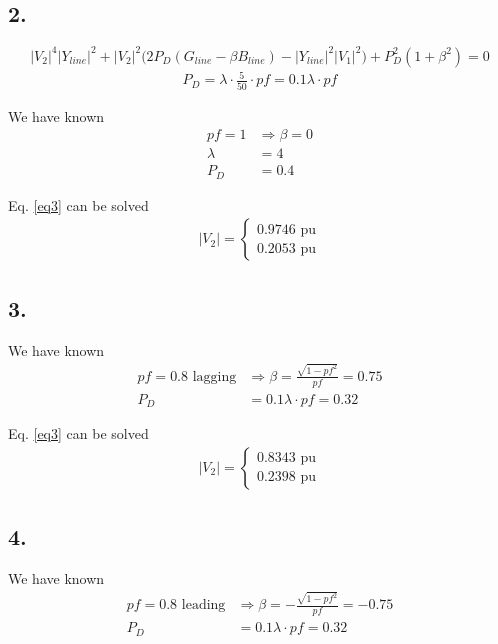 \documentclass{article}
\begin{document}
\subsection*{2.}
\begin{equation}\label{eq3}
|V_2|^4 |Y_{line}|^2 + |V_2|^2 \Big(2 P_D (G_{line} - \beta B_{line}) - |Y_{line}|^2 |V_1|^2 \Big) + P_D^2 (1+\beta^2) = 0
\end{equation}
\begin{align*}
P_D = \lambda \cdot \frac{5}{50} \cdot pf = 0.1 \lambda \cdot pf
\end{align*}

We have known
\begin{align*}
pf = 1 &\Longrightarrow \beta = 0\\
\lambda &= 4\\
P_D &= 0.4
\end{align*}

Eq. \ref{eq3} can be solved
\begin{align*}
|V_2| =
\begin{cases}
0.9746 \text{ pu}\\
0.2053 \text{ pu}
\end{cases}
\end{align*}

\subsection*{3.}
We have known
\begin{align*}
pf = 0.8 \text{ lagging} &\Longrightarrow \beta = \frac{\sqrt{1 - pf^2}}{pf} = 0.75\\
P_D &= 0.1 \lambda \cdot pf = 0.32
\end{align*}

Eq. \ref{eq3} can be solved
\begin{align*}
|V_2| =
\begin{cases}
0.8343 \text{ pu}\\
0.2398 \text{ pu}
\end{cases}
\end{align*}

\subsection*{4.}
We have known
\begin{align*}
pf = 0.8 \text{ leading}&\Longrightarrow \beta = - \frac{\sqrt{1 - pf^2}}{pf} = -0.75\\
P_D &= 0.1 \lambda \cdot pf = 0.32
\end{align*}
\end{document}
